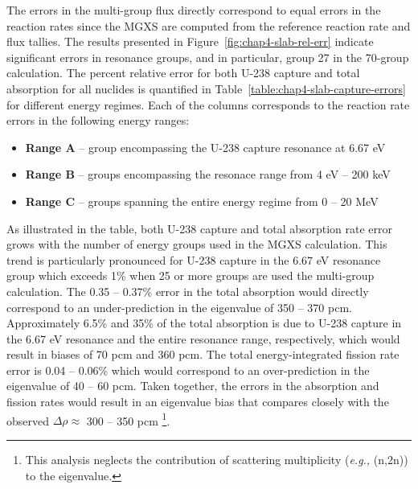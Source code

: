 The errors in the multi-group flux directly correspond to equal errors in the reaction rates since the \ac{MGXS} are computed from the reference reaction rate and flux tallies. The results presented in Figure~\ref{fig:chap4-slab-rel-err} indicate significant errors in resonance groups, and in particular, group 27 in the 70-group calculation. The percent relative error for both U-238 capture and total absorption for all nuclides is quantified in Table~\ref{table:chap4-slab-capture-errors} for different energy regimes. Each of the columns corresponds to the reaction rate errors in the following energy ranges:

\vspace{-0.1in}
\begin{itemize}[noitemsep]
  \item {\bf Range A} -- group encompassing the U-238 capture resonance at 6.67 eV
  \item {\bf Range B} -- groups encompassing the resonace range from 4 eV -- 200 keV
  \item {\bf Range C} -- groups spanning the entire energy regime from 0 -- 20 MeV
\end{itemize}
\vspace{-0.1in}

As illustrated in the table, both U-238 capture and total absorption rate error grows with the number of energy groups used in the \ac{MGXS} calculation. This trend is particularly pronounced for U-238 capture in the 6.67 eV resonance group which exceeds 1\% when 25 or more groups are used the multi-group calculation. The 0.35 -- 0.37\% error in the total absorption would directly correspond to an under-prediction in the eigenvalue of 350 -- 370 pcm. Approximately 6.5\% and 35\% of the total absorption is due to U-238 capture in the 6.67 eV resonance and the entire resonance range, respectively, which would result in biases of 70 pcm and 360 pcm. The total energy-integrated fission rate error is 0.04 -- 0.06\% which would correspond to an over-prediction in the eigenvalue of 40 -- 60 pcm. Taken together, the errors in the absorption and fission rates would result in an eigenvalue bias that compares closely with the observed $\Delta\rho \approx$ 300 -- 350 pcm \footnote{This analysis neglects the contribution of scattering multiplicity (\textit{e.g.,} (n,2n)) to the eigenvalue.}.






